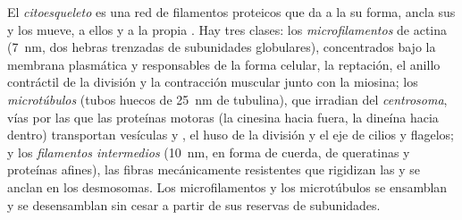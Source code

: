 \begin{definition}[Citoesqueleto]\label{def:b1:eukaryotic-cell:cytoskeleton}
El \emph{citoesqueleto} es una red de filamentos
proteicos que da a la  su forma, ancla sus  y los mueve, a
ellos y a la propia . Hay tres clases: los
\emph{microfilamentos} de actina (\qty{7}{nm}, dos
hebras trenzadas de subunidades globulares), concentrados bajo la membrana
plasmática y responsables de la forma celular, la reptación, el anillo
contráctil de la división y la contracción muscular junto con la miosina;
los \emph{microtúbulos} (tubos huecos de \qty{25}{nm} de
tubulina), que irradian del \emph{centrosoma}, vías por
las que las proteínas motoras (la cinesina hacia fuera, la dineína hacia
dentro) transportan vesículas y , el huso de la división y el eje
de cilios y flagelos; y los \emph{filamentos intermedios} (\qty{10}{nm}, en forma de cuerda, de queratinas y proteínas
afines), las fibras mecánicamente resistentes que rigidizan las  y se
anclan en los desmosomas. Los microfilamentos y los microtúbulos se ensamblan
y se desensamblan sin cesar a partir de sus reservas de subunidades.
\end{definition}

